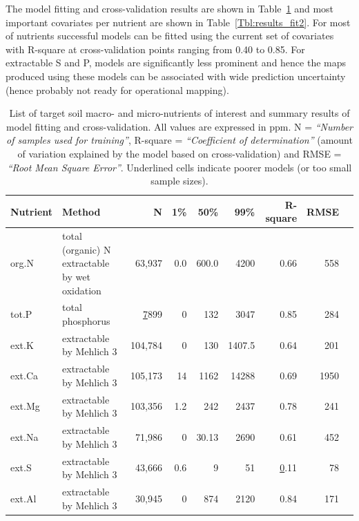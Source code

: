 \begin{linenumbers}
The model fitting and cross-validation results are shown in Table~\ref{Tbl:results_fit1} and most important covariates per nutrient are shown in Table~\ref{Tbl:results_fit2}. For most of nutrients successful models can be fitted using the current set of covariates with R-square at cross-validation points ranging from 0.40 to 0.85. For extractable S and P, models are significantly less prominent and hence the maps produced using these models can be associated with wide prediction uncertainty (hence probably not ready for operational mapping). \par

\begin{table}
\centering
\caption{List of target soil macro- and micro-nutrients of interest and summary results of model fitting and cross-validation. All values are expressed in ppm. N = \emph{``Number of samples used for training''}, R-square = \emph{``Coefficient of determination''} (amount of variation explained by the model based on cross-validation) and  RMSE = \emph{``Root Mean Square Error''}. Underlined cells indicate poorer models (or too small sample sizes).}\label{Tbl:results_fit1}
{\footnotesize
\begin{tabular}{m{}m{}rrrrrrm{}}
\toprule
Nutrient  & Method   & N   & 1\% &  50\% & 99\% & R-square & RMSE  \\ \midrule             
org.\@ N   & total (organic) N extractable by wet oxidation & 63,937 & 0.0 & 600.0 & 4200  & 0.66  & 558   \\ \midrule
tot.\@ P   & total phosphorus  & {\ul 7899}   & 0 & 132 & 3047        & 0.85   & 284   \\
\midrule
ext.\@ K        & extractable by Mehlich 3  & 104,784 & 0 & 130 & 1407.5     & 0.64    & 201    \\
\midrule
ext.\@ Ca       & extractable by Mehlich 3  & 105,173 & 14 & 1162 & 14288             & 0.69              & 1950    \\
\midrule
ext.\@ Mg       & extractable by Mehlich 3  & 103,356 & 1.2 & 242 & 2437              & 0.78               & 241    \\
\midrule
ext.\@ Na       & extractable by Mehlich 3          & 71,986 & 0 & 30.13 & 2690              & 0.61              & 452     \\
\midrule
ext.\@ S        & extractable by Mehlich 3          & 43,666 & 0.6 & 9 & 51                  & {\ul 0.11}              & 78    \\
\midrule
ext.\@ Al       & extractable by Mehlich 3          & 30,945 & 0 & 874 & 2120                & 0.84              & 171  \\

\end{tabular}}
\end{table}
\end{linenumbers}
